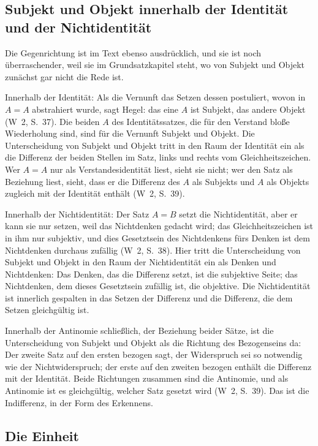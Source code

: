 \documentclass[11pt,a4paper]{article}
\newcommand{\Werke}[1]{(W~2, S.~#1)}
\begin{document}
\subsection{Subjekt und Objekt innerhalb der Identität und der Nichtidentität}

Die Gegenrichtung ist im Text ebenso ausdrücklich, und sie ist noch überraschender, weil sie im Grundsatzkapitel steht, wo von Subjekt und Objekt zunächst gar nicht die Rede ist.

Innerhalb der Identität: Als die Vernunft das Setzen dessen postuliert, wovon in $A = A$ abstrahiert wurde, sagt Hegel: \glqq das eine $A$ ist Subjekt, das andere Objekt\grqq{} \Werke{37}. Die beiden $A$ des Identitätssatzes, die für den Verstand bloße Wiederholung sind, sind für die Vernunft Subjekt und Objekt. Die Unterscheidung von Subjekt und Objekt tritt in den Raum der Identität ein als die Differenz der beiden Stellen im Satz, links und rechts vom Gleichheitszeichen. Wer $A = A$ nur als Verstandesidentität liest, sieht sie nicht; wer den Satz als Beziehung liest, sieht, dass er \glqq die Differenz des $A$ als Subjekts und $A$ als Objekts zugleich mit der Identität\grqq{} enthält \Werke{39}.

Innerhalb der Nichtidentität: Der Satz $A = B$ setzt die Nichtidentität, aber er kann sie nur setzen, weil das Nichtdenken gedacht wird; das Gleichheitszeichen ist in ihm \glqq nur subjektiv\grqq{}, und \glqq dies Gesetztsein des Nichtdenkens fürs Denken ist dem Nichtdenken durchaus zufällig\grqq{} \Werke{38}. Hier tritt die Unterscheidung von Subjekt und Objekt in den Raum der Nichtidentität ein als Denken und Nichtdenken: Das Denken, das die Differenz setzt, ist die subjektive Seite; das Nichtdenken, dem dieses Gesetztsein zufällig ist, die objektive. Die Nichtidentität ist innerlich gespalten in das Setzen der Differenz und die Differenz, die dem Setzen gleichgültig ist.

Innerhalb der Antinomie schließlich, der Beziehung beider Sätze, ist die Unterscheidung von Subjekt und Objekt als die Richtung des Bezogenseins da: Der zweite Satz auf den ersten bezogen sagt, der Widerspruch sei so notwendig wie der Nichtwiderspruch; der erste auf den zweiten bezogen enthält die Differenz mit der Identität. Beide Richtungen zusammen sind die Antinomie, und als Antinomie ist es gleichgültig, welcher Satz gesetzt wird \Werke{39}. Das ist die Indifferenz, in der Form des Erkennens.

\subsection{Die Einheit}
\end{document}

